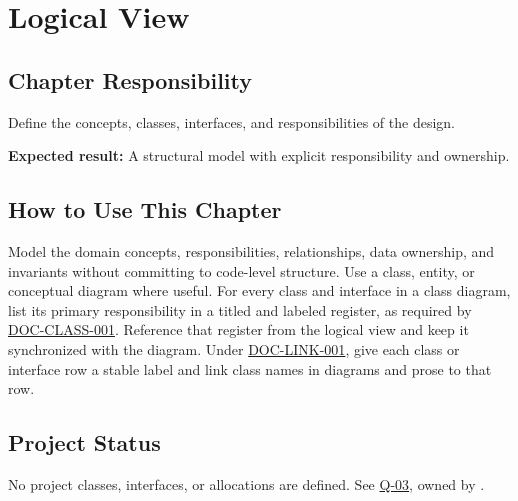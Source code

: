 \chapter{Logical View}
\section{Chapter Responsibility}
\label{Section:LogicalViewResponsibility}
Define the concepts, classes, interfaces, and responsibilities of the design.

\noindent\textbf{Expected result:} A structural model with explicit responsibility and ownership.

\section{How to Use This Chapter}
Model the domain concepts, responsibilities, relationships, data ownership, and invariants without committing to code-level structure. Use a class, entity, or conceptual diagram where useful. For every class and interface in a class diagram, list its primary responsibility in a titled and labeled register, as required by \hyperref[Requirement:DOCCLASS001]{DOC-CLASS-001}. Reference that register from the logical view and keep it synchronized with the diagram. Under \hyperref[Requirement:DOCLINK001]{DOC-LINK-001}, give each class or interface row a stable label and link class names in diagrams and prose to that row.

\section{Project Status}
No project classes, interfaces, or allocations are defined.
See \hyperref[Question:Q-03]{Q-03}, owned by \DocumentOwner.
